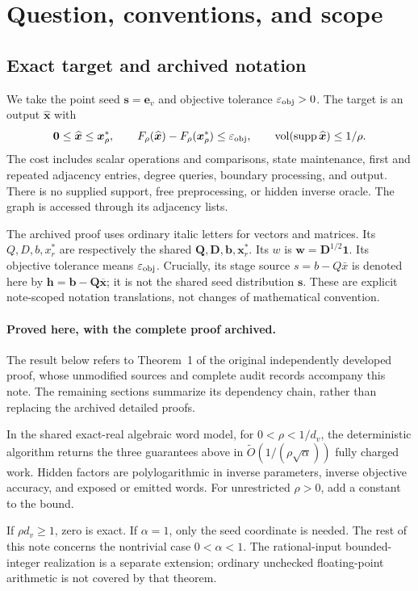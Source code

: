 \section{Question, conventions, and scope}

\subsection{Exact target and archived notation}
We take the point seed $\bm{s}=\bm{e}_v$ and objective tolerance
$\varepsilon_{\mathrm{obj}}>0$. The target is an output $\widehat{\bm{x}}$ with
\[
 \bm{0}\le\widehat{\bm{x}}\le\bm{x}_\rho^*,\qquad
 F_\rho(\widehat{\bm{x}})-F_\rho(\bm{x}_\rho^*)\le\varepsilon_{\mathrm{obj}},
 \qquad\operatorname{vol}(\operatorname{supp}\widehat{\bm{x}})\le1/\rho.
\]
The cost includes scalar operations and comparisons, state maintenance,
first and repeated adjacency entries, degree queries, boundary processing,
and output. There is no supplied support, free preprocessing, or hidden
inverse oracle. The graph is accessed through its adjacency lists.

The archived proof uses ordinary italic letters for vectors and matrices.
Its $Q,D,b,x_r^*$ are respectively the shared $\bm{Q},\bm{D},\bm{b},\bm{x}_r^*$.
Its $w$ is $\bm{w}=\bm{D}^{1/2}\bm{1}$. Its objective tolerance means $\varepsilon_{\mathrm{obj}}$.
Crucially, its stage source $s=b-Q\bar x$ is denoted here by
$\bm{h}=\bm{b}-\bm{Q}\overline{\bm{x}}$; it is not the shared seed
distribution $\bm{s}$. These are explicit note-scoped notation translations,
not changes of mathematical convention.

\paragraph{Proved here, with the complete proof archived.}
The result below refers to Theorem~1 of the original independently developed
proof, whose unmodified sources and complete audit records accompany this note.
The remaining sections summarize its dependency chain, rather than replacing
the archived detailed proofs.
\begin{theorem}\label{thm:archived-op2}
In the shared exact-real algebraic word model, for $0<\rho<1/d_v$, the
deterministic algorithm returns the three guarantees above in
$\widetilde O(1/(\rho\sqrt\alpha))$ fully charged work. Hidden factors are
polylogarithmic in inverse parameters, inverse objective accuracy, and exposed
or emitted words. For unrestricted $\rho>0$, add a constant to the bound.
\end{theorem}
If $\rho d_v\ge1$, zero is exact. If $\alpha=1$, only the seed coordinate
is needed. The rest of this note concerns the nontrivial case $0<\alpha<1$.
The rational-input bounded-integer realization is a separate extension;
ordinary unchecked floating-point arithmetic is not covered by that theorem.
